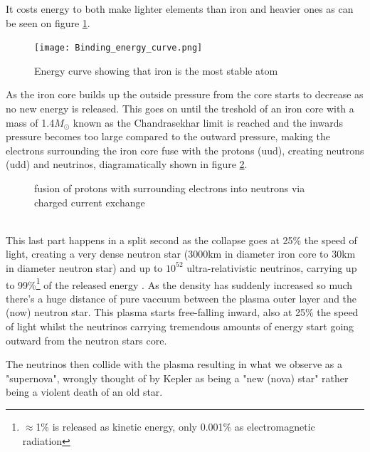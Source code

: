 It costs energy
to both make lighter elements than iron and heavier ones as can be seen on
figure \ref{fig:BindingEnergyCurve}\cite{IronIllu}.
\begin{figure}[!ht]
	\centering
	\texttt{[image: Binding\_energy\_curve.png]}
	\caption{Energy curve showing that iron is the most stable atom}
	\label{fig:BindingEnergyCurve}
\end{figure}
  As the iron core builds up the outside
pressure from the core starts to decrease as no new energy is released. This
goes on until  the treshold of an iron core with a mass of 1.4$M_\odot$ known
as the Chandrasekhar limit is reached and the inwards pressure becomes too
large compared to the outward pressure, making the electrons surrounding the
iron core fuse with the protons (uud), creating neutrons (udd) and neutrinos,
diagramatically shown in figure
\ref{fig:CoreFusion}.
\begin{figure}[h]
	\centering
	\caption{fusion of protons with surrounding electrons into neutrons via charged current exchange}
	\label{fig:CoreFusion}
\end{figure}\\
This last part happens in a split second as the collapse goes at 25\% the speed
of light, creating a very dense neutron star (3000km in diameter iron core to
30km in diameter neutron star) and up to $10^{52}$ ultra-relativistic
neutrinos, carrying up to 99\%\footnote{$\approx$1\% is released as kinetic energy, only 0.001\% as
electromagnetic radiation} of the released energy
\cite{Melson_2015}. As the density has suddenly increased so much
there's a huge distance of pure vaccuum between the plasma outer layer and the
(now) neutron star. This plasma starts free-falling inward, also at 25\% the
speed of light whilst the neutrinos carrying tremendous amounts of energy start
going outward from the neutron stars core.

The neutrinos then collide with the plasma resulting in what we observe as a
"supernova", wrongly thought of by Kepler as being a "new (nova) star" rather
being a violent death of an old star.

